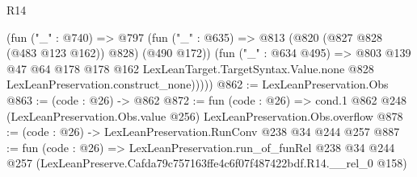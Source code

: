 \begin{lexlean}{R14}
\begin{coremodule}
          (fun ("_" : @740) =>
          @797
            (fun ("_" : @635) => @813 (@820 (@827 @828 (@483 @123 @162)) @828) (@490 @172))
            (fun ("_" : @634 @495) =>
            @803
              @139
              @47
              @64
              @178
              @178
              @162
              LexLeanTarget.TargetSyntax.Value.none
              @828
              LexLeanPreservation.construct_none)))))
@862 := LexLeanPreservation.Obs
@863 := (code : @26) -> @862
@872 := fun (code : @26) =>
  cond.{1} @862 @248 (LexLeanPreservation.Obs.value @256) LexLeanPreservation.Obs.overflow
@878 := (code : @26) -> LexLeanPreservation.RunConv @238 @34 @244 @257
@887 := fun (code : @26) =>
  LexLeanPreservation.run_of_funRel
    @238
    @34
    @244
    @257
    (LexLeanPreserve.Cafda79c757163ffe4c6f07f487422bdf.R14.__rel_0 @158)
\end{coremodule}
\end{lexlean}
